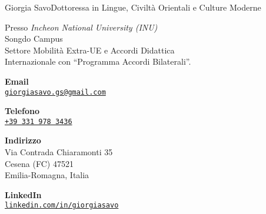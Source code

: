 \documentclass{article}
\begin{document}
\begin{cv}[avatar]{Giorgia Savo}{Dottoressa in Lingue, Civiltà Orientali e Culture Moderne}

\begin{cvevent}[Marzo 2022][Luglio 2022]
    Presso \textit{Incheon National University (INU)}\\ Songdo Campus\\
    Settore Mobilità Extra-UE e Accordi Didattica\\
    Internazionale con “Programma Accordi Bilaterali”.
\end{cvevent}

\cvseparator[2]
\begin{cvevent}[2014]
\end{cvevent}

\cvsidebar %



\begin{cvitem}[Envelope][4]
    \textbf{Email}\\
    \href{mailto:}{\texttt{giorgiasavo.gs@gmail.com}}
\end{cvitem}

\cvseparator[3]
\begin{cvitem}[Phone][5]
    \textbf{Telefono}\\
    \href{tel:+393319783436}{\texttt{+39 331 978 3436}}
\end{cvitem}

\cvseparator[3]
\begin{cvitem}[Home][5]
    \textbf{Indirizzo}\\
    Via Contrada Chiaramonti 35\\ Cesena (FC) 47521\\ Emilia-Romagna, Italia
\end{cvitem}

\cvseparator[3]
\begin{cvitem}[Linkedin][5]
	\textbf{LinkedIn}\\
	\href{www.linkedin.com/in/giorgiasavo}{\texttt{linkedin.com/in/giorgiasavo}}
\end{cvitem}




\end{cv}
\end{document}
